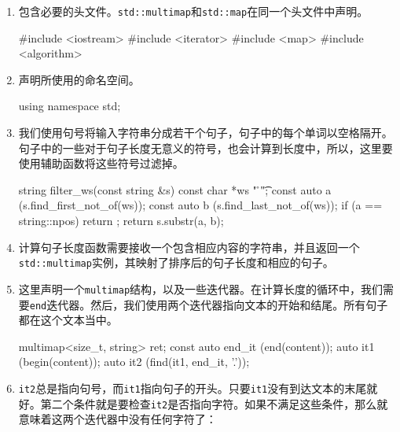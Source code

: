 \begin{enumerate}
\item 包含必要的头文件。\texttt{std::multimap}和\texttt{std::map}在同一个头文件中声明。

\begin{codebox}[cpp]
#include <iostream>
#include <iterator>
#include <map>
#include <algorithm>
\end{codebox}

\item 声明所使用的命名空间。

\begin{codebox}[cpp]
using namespace std;
\end{codebox}

\item 我们使用句号将输入字符串分成若干个句子，句子中的每个单词以空格隔开。句子中的一些对于句子长度无意义的符号，也会计算到长度中，所以，这里要使用辅助函数将这些符号过滤掉。

\begin{codebox}[cpp]
string filter_ws(const string &s)
{
    const char *ws {" \r\n\t"};
    const auto a (s.find_first_not_of(ws));
    const auto b (s.find_last_not_of(ws));
    if (a == string::npos) {
        return {};
    }
    return s.substr(a, b);
}
\end{codebox}

\item 计算句子长度函数需要接收一个包含相应内容的字符串，并且返回一个\texttt{std::multimap}实例，其映射了排序后的句子长度和相应的句子。

\begin{codebox}[cpp]
multimap<size_t, string> get_sentence_stats(const string &content)
{
\end{codebox}

\item 这里声明一个\texttt{multimap}结构，以及一些迭代器。在计算长度的循环中，我们需要\texttt{end}迭代器。然后，我们使用两个迭代器指向文本的开始和结尾。所有句子都在这个文本当中。

\begin{codebox}[cpp]
multimap<size_t, string> ret;
const auto end_it (end(content));
auto it1 (begin(content));
auto it2 (find(it1, end_it, '.'));
\end{codebox}

\item \texttt{it2}总是指向句号，而\texttt{it1}指向句子的开头。只要\texttt{it1}没有到达文本的末尾就好。第二个条件就是要检查\texttt{it2}是否指向字符。如果不满足这些条件，那么就意味着这两个迭代器中没有任何字符了：


\end{enumerate}
